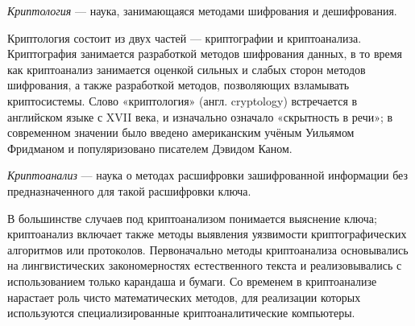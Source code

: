 \DEF\textit{Криптология} — наука, занимающаяся методами шифрования и 
дешифрования. 

Криптология состоит из двух частей — криптографии и криптоанализа. 
Криптография 
занимается разработкой методов шифрования данных, в то время как 
криптоанализ занимается оценкой сильных и слабых сторон методов 
шифрования, а также разработкой методов, позволяющих взламывать 
криптосистемы. Слово «криптология» (англ. cryptology) встречается в 
английском языке с XVII века, и изначально означало «скрытность в речи»; 
в современном значении было введено американским учёным Уильямом Фридманом 
и популяризовано писателем Дэвидом Каном.

\DEF\textit{Криптоанализ} — 
наука о методах расшифровки зашифрованной информации без предназначенного 
для такой расшифровки ключа.

В большинстве случаев под криптоанализом понимается выяснение ключа; 
криптоанализ включает также методы выявления уязвимости криптографических 
алгоритмов или протоколов. Первоначально методы криптоанализа основывались 
на лингвистических закономерностях естественного текста и реализовывались 
с использованием только карандаша и бумаги. Со временем в криптоанализе 
нарастает роль чисто математических методов, для реализации которых 
используются специализированные криптоаналитические компьютеры.
